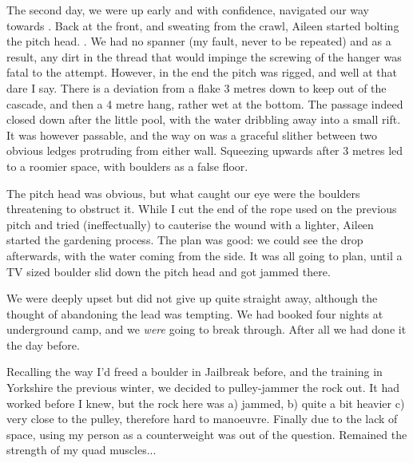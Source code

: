 The second day, we were up early and with confidence, navigated our way towards . Back at the front, and sweating from the crawl, Aileen started bolting the pitch head. . We had no spanner (my fault, never to be repeated) and as a result, any dirt in the thread that would impinge the screwing of the hanger was fatal to the attempt. However, in the end the pitch was rigged, and well at that dare I say. There is a deviation from a flake 3 metres down to keep out of the cascade, and then a 4 metre hang, rather wet at the bottom. The passage indeed closed down after the little pool, with the water dribbling away into a small rift. It was however passable, and the way on was a graceful slither between two obvious ledges protruding from either wall. Squeezing upwards after 3 metres led to a roomier space, with boulders as a false floor.

The pitch head was obvious, but what caught our eye were the boulders threatening to obstruct it. While I cut the end of the rope used on the previous pitch and tried (ineffectually) to cauterise the wound with a lighter, Aileen started the gardening process. The plan was good: we could see the drop afterwards, with the water coming from the side. It was all going to plan, until a TV sized boulder slid down the pitch head and got jammed there. 

We were deeply upset but did not give up quite straight away, although the thought of abandoning the lead  was tempting.  We had booked four nights at underground camp, and we \emph{were} going to break through. After all we had done it the day before.

Recalling the way I'd freed a boulder in Jailbreak before, and the training in Yorkshire the previous winter, we decided to pulley-jammer the rock out. It had worked before I knew, but the rock here was a) jammed, b) quite a bit heavier c) very close to the pulley, therefore hard to manoeuvre. Finally due to the lack of space, using my person as a counterweight was out of the question. Remained the strength of my quad muscles...

